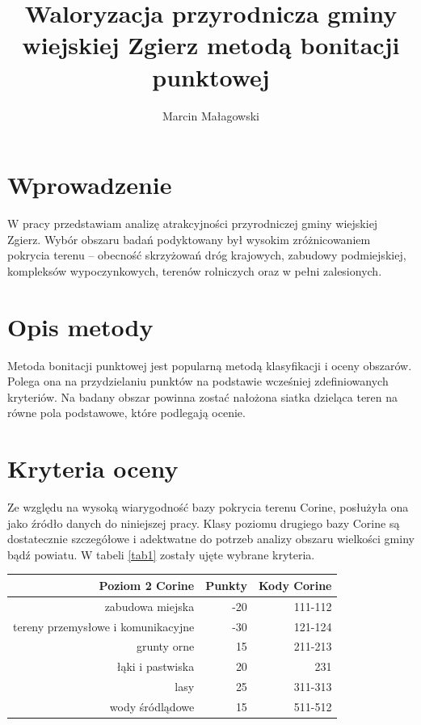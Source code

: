 \documentclass[11pt]{article} %
\title{Waloryzacja przyrodnicza gminy wiejskiej Zgierz metodą bonitacji punktowej}
\author{Marcin Małagowski}
\begin{document}
\maketitle

\section{Wprowadzenie}

W pracy przedstawiam analizę atrakcyjności przyrodniczej gminy wiejskiej Zgierz. Wybór obszaru badań podyktowany był wysokim zróżnicowaniem pokrycia terenu -- obecność skrzyżowań dróg krajowych, zabudowy podmiejskiej, kompleksów wypoczynkowych, terenów rolniczych oraz w pełni zalesionych.

\section{Opis metody}

Metoda bonitacji punktowej jest popularną metodą klasyfikacji i oceny obszarów. Polega ona na przydzielaniu punktów na podstawie wcześniej zdefiniowanych kryteriów. Na badany obszar powinna zostać nałożona siatka dzieląca teren na równe pola podstawowe, które podlegają ocenie.

\section{Kryteria oceny}

Ze względu na wysoką wiarygodność bazy pokrycia terenu Corine, posłużyła ona jako źródło danych do niniejszej pracy. Klasy poziomu drugiego bazy Corine są dostatecznie szczegółowe i adektwatne do potrzeb analizy obszaru wielkości gminy bądź powiatu. W tabeli \ref{tab1} zostały ujęte wybrane kryteria.

\begin{center}
\label{tab1}
\begin{tabular}{|r|r|r|}
\hline
Poziom 2 Corine & Punkty & Kody Corine\\
\hline
zabudowa miejska & -20 & 111-112 \\  
tereny przemysłowe i komunikacyjne & -30 & 121-124 \\
grunty orne & 15 & 211-213 \\
łąki i pastwiska & 20 & 231 \\
lasy & 25 & 311-313 \\ 
wody śródlądowe & 15 & 511-512 \\
\hline
\end{tabular}
\end{center}
\end{document}
